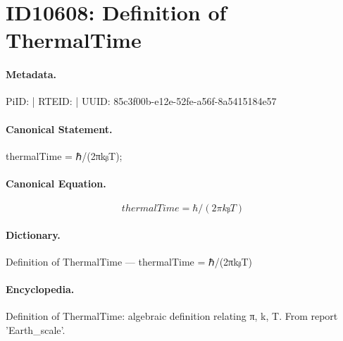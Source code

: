 \section*{ID10608: Definition of ThermalTime}
\paragraph{Metadata.}
PiID:  | RTEID:  | UUID: 85c3f00b-e12e-52fe-a56f-8a5415184e57

\paragraph{Canonical Statement.}
thermalTime = ℏ/(2πkᵦT);

\paragraph{Canonical Equation.}
\[
thermalTime = ℏ/(2πkᵦT)
\]

\paragraph{Dictionary.}
Definition of ThermalTime — thermalTime = ℏ/(2πkᵦT)

\paragraph{Encyclopedia.}
Definition of ThermalTime: algebraic definition relating π, k, T. From report 'Earth\_scale'.

